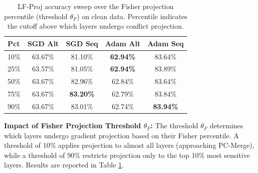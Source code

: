 \documentclass{article}
\theoremstyle{plain}
\theoremstyle{definition}
\theoremstyle{remark}
\begin{document}
\begin{table}[h]
\caption{LF-Proj accuracy sweep over the Fisher projection percentile (threshold $\theta_F$) on clean data. Percentile indicates the cutoff above which layers undergo conflict projection.}
\label{tab:pct_sweep}
\vskip 0.15in
\begin{center}
\begin{small}
\begin{sc}
\begin{tabular}{lcccc}
\toprule
Pct & SGD Alt & SGD Seq & Adam Alt & Adam Seq \\
\midrule
10\% & 63.67\% & 81.10\% & \textbf{62.94\%} & 83.64\% \\
25\% & 63.57\% & 81.05\% & \textbf{62.94\%} & 83.89\% \\
50\% & 63.67\% & 82.96\% & 62.84\% & 83.64\% \\
75\% & 63.67\% & \textbf{83.20\%} & 62.79\% & 83.84\% \\
90\% & 63.67\% & 83.01\% & 62.74\% & \textbf{83.94\%} \\
\bottomrule
\end{tabular}
\end{sc}
\end{small}
\end{center}
\vskip -0.1in
\end{table}

\textbf{Impact of Fisher Projection Threshold $\theta_F$:} The threshold $\theta_F$ determines which layers undergo gradient projection based on their Fisher percentile. A threshold of 10\% applies projection to almost all layers (approaching PC-Merge), while a threshold of 90\% restricts projection only to the top 10\% most sensitive layers. Results are reported in Table \ref{tab:pct_sweep}.
\end{document}
